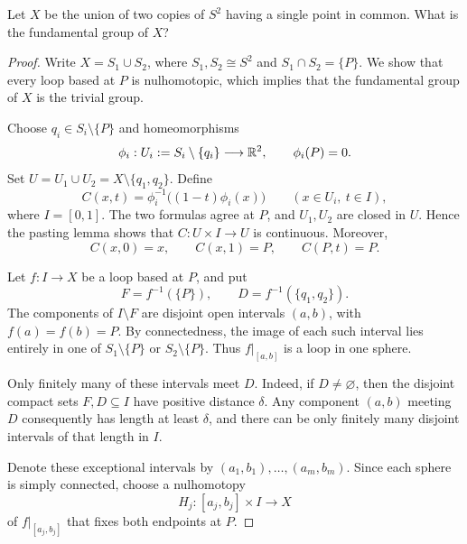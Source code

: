 \documentclass[12pt,a4paper]{article}
\begin{document}
    \begin{ex}
        Let $X$ be the union of two copies of $S^2$ having a single point in common. What is the fundamental group of $X$?
    \end{ex}
    \begin{proof}
        Write $X=S_1\cup S_2$, where $S_1,S_2\cong S^2$ and
        $S_1\cap S_2=\{P\}$. We show that every loop based at $P$
        is nulhomotopic, which implies that the fundamental group of $X$ is the trivial group.
        
        Choose $q_i\in S_i\setminus\{P\}$ and homeomorphisms
        \[
            \phi_i:U_i:=S_i\setminus\{q_i\}\longrightarrow\mathbb{R}^2,
            \qquad \phi_i(P)=0.
        \]
        Set $U=U_1\cup U_2=X\setminus\{q_1,q_2\}$. Define
        \[
            C(x,t)=\phi_i^{-1}\bigl((1-t)\phi_i(x)\bigr)
            \qquad (x\in U_i,\ t\in I),
        \]
        where $I=[0,1]$. The two formulas agree at $P$, and
        $U_1,U_2$ are closed in $U$. Hence the pasting lemma
        shows that $C:U\times I\to U$ is continuous. Moreover,
        \[
            C(x,0)=x,\qquad C(x,1)=P,\qquad C(P,t)=P.
        \]
        
        Let $f:I\to X$ be a loop based at $P$, and put
        \[
            F=f^{-1}(\{P\}),\qquad
            D=f^{-1}(\{q_1,q_2\}).
        \]
        The components of $I\setminus F$ are disjoint open intervals
        $(a,b)$, with $f(a)=f(b)=P$. By connectedness, the image
        of each such interval lies entirely in one of
        $S_1\setminus\{P\}$ or $S_2\setminus\{P\}$. Thus
        $f|_{[a,b]}$ is a loop in one sphere.
        
        Only finitely many of these intervals meet $D$. Indeed,
        if $D\ne\varnothing$, then the disjoint compact sets
        $F,D\subseteq I$ have positive distance $\delta$.
        Any component $(a,b)$ meeting $D$ consequently has
        length at least $\delta$, and there can be only finitely
        many disjoint intervals of that length in $I$.
        
        Denote these exceptional intervals by
        $(a_1,b_1),\ldots,(a_m,b_m)$. Since each sphere is simply
        connected, choose a nulhomotopy
        \[
            H_j:[a_j,b_j]\times I\longrightarrow X
        \]
        of $f|_{[a_j,b_j]}$ that fixes both endpoints at $P$.
        

\end{proof}
\end{document}

